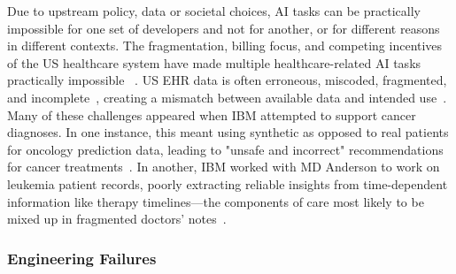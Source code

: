 \documentclass[acmconf,manuscript,screen,natbib=true]{acmart}
\begin{document}
Due to upstream policy, data or societal choices, AI tasks can be practically impossible for one set of developers and not for another, or for different reasons in different contexts. The fragmentation, billing focus, and competing incentives of the US healthcare system have made multiple healthcare-related AI tasks practically impossible
~\cite{Agrawal2020-rs}.
US EHR data is often erroneous, miscoded, fragmented, and incomplete~\cite{Hoffman2013-oa,Hoffman2013-ms}, creating a mismatch between available data and intended use~\cite{Gianfrancesco2018-vl}. Many of these challenges appeared when IBM attempted to support cancer diagnoses. In one instance, this meant using synthetic as opposed to real patients for oncology prediction data, leading to "unsafe and incorrect" recommendations for cancer treatments~\cite{Ross2018-nn}. In another, IBM worked with MD Anderson to work on leukemia patient records, poorly extracting reliable insights from time-dependent information like therapy timelines---the components of care most likely to be mixed up in fragmented doctors' notes~\cite{Strickland_undated-ng, Simon2019-ed}. 






\subsubsection{Engineering Failures}
\end{document}
